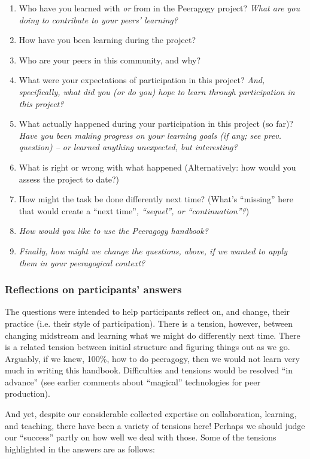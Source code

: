\begin{enumerate}
\item
  Who have you learned with \emph{or} from in the Peeragogy project?
  \emph{What are you doing to contribute to your peers' learning?}
\item
  How have you been learning during the project?
\item
  Who are your peers in this community, and why?
\item
  What were your expectations of participation in this project?
  \emph{And, specifically, what did you (or do you) hope to learn
  through participation in this project?}
\item
  What actually happened during your participation in this project (so
  far)? \emph{Have you been making progress on your learning goals (if
  any; see prev. question) -- or learned anything unexpected, but
  interesting?}
\item
  What is right or wrong with what happened (Alternatively: how would
  you assess the project to date?)
\item
  How might the task be done differently next time? (What's ``missing''
  here that would create a ``next time''\emph{, ``sequel'', or
  ``continuation''?})
\item
  \emph{How would you like to use the Peeragogy handbook?}
\item
  \emph{Finally, how might we change the questions, above, if we wanted
  to apply them in your peeragogical context?}
\end{enumerate}
\subsubsection{\textbf{Reflections on participants' answers}}

The questions were intended to help participants reflect on, and change,
their practice (i.e. their style of participation). There is a tension,
however, between changing midstream and learning what we might do
differently next time. There is a related tension between initial
structure and figuring things out as we go. Arguably, if we knew, 100\%,
how to do peeragogy, then we would not learn very much in writing this
handbook. Difficulties and tensions would be resolved ``in advance''
(see earlier comments about ``magical'' technologies for peer
production).

And yet, despite our considerable collected expertise on collaboration,
learning, and teaching, there have been a variety of tensions here!
Perhaps we should judge our ``success'' partly on how well we deal with
those. Some of the tensions highlighted in the answers are as follows:

